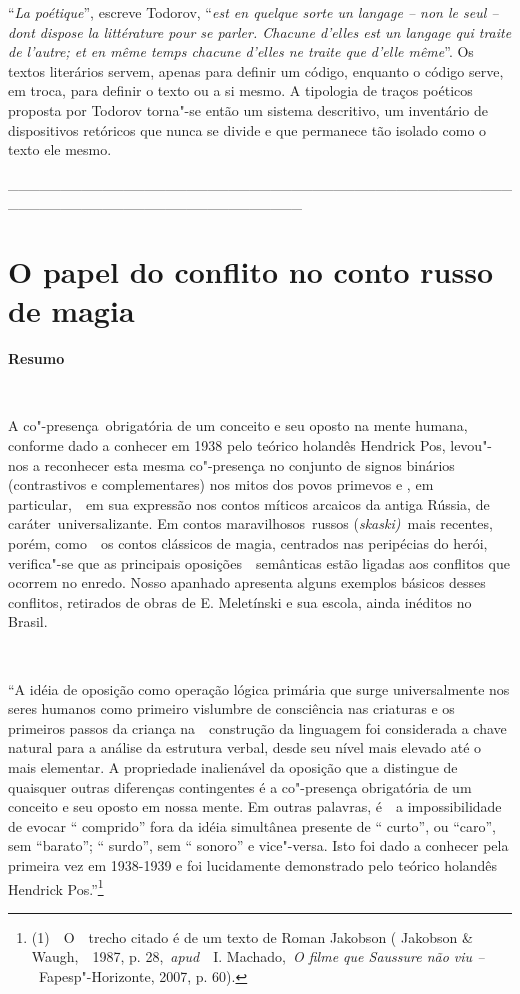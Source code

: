``\emph{La poétique}'', escreve Todorov, ``\emph{est en quelque sorte un
langage -- non le seul -- dont dispose la littérature pour se parler.
Chacune d'elles est un langage qui traite de l'autre; et en même temps
chacune d'elles ne traite que d'elle même}''. Os textos literários
servem, apenas para definir um código, enquanto o código serve, em
troca, para definir o texto ou a si mesmo. A tipologia de traços
poéticos proposta por Todorov torna"-se então um sistema descritivo, um
inventário de dispositivos retóricos que nunca se divide e que permanece
tão isolado como o texto ele mesmo.

\_\_\_\_\_\_\_\_\_\_\_\_\_\_\_\_\_\_\_\_\_\_\_\_\_\_\_\_\_\_\_\_\_\_\_\_\_\_\_\_\_\_\_\_\_\_\_\_\_\_\_\_\_\_\_\_\_\_\_\_\_\_\_\_\_\_\_\_\_\_\_\_\_\_\_\_

\chapter{O papel do conflito no conto russo de magia}

\textbf{Resumo}

\textbf{~}

A co"-presença~obrigatória de um conceito e seu oposto na mente humana,
conforme dado a conhecer em 1938 pelo teórico holandês Hendrick Pos,
levou"-nos a reconhecer esta mesma co"-presença no conjunto de signos
binários (contrastivos e complementares) nos mitos dos povos primevos e
, em particular,~~em sua expressão nos contos míticos arcaicos da antiga
Rússia, de caráter~universalizante. Em contos maravilhosos~russos
(\emph{skaski)~}mais recentes, porém, como~~os contos clássicos de
magia, centrados nas peripécias do herói, verifica"-se que as principais
oposições~~semânticas estão ligadas aos conflitos que ocorrem no enredo.
Nosso apanhado apresenta alguns exemplos básicos desses conflitos,
retirados de obras de E. Meletínski e sua escola, ainda inéditos no
Brasil.

\textbf{~}

``A idéia de oposição como operação lógica primária que surge
universalmente nos seres humanos como primeiro vislumbre de consciência
nas criaturas e os primeiros passos da criança na~~construção da
linguagem foi considerada a chave natural para a análise da estrutura
verbal, desde seu nível mais elevado até o mais elementar. A propriedade
inalienável da oposição que a distingue de quaisquer outras diferenças
contingentes é a co"-presença obrigatória de um conceito e seu oposto em
nossa mente. Em outras palavras, é~~a impossibilidade de evocar ``
comprido'' fora da idéia simultânea presente de `` curto'', ou ``caro'',
sem ``barato''; `` surdo'', sem `` sonoro'' e vice"-versa. Isto foi dado
a conhecer pela primeira vez em 1938-1939 e foi lucidamente demonstrado
pelo teórico holandês Hendrick Pos.''\footnote{(1)~~O~~trecho citado é
  de um texto de Roman Jakobson ( Jakobson \& Waugh,~~1987, p.
  28,~\emph{apud}~~I. Machado,~\emph{O filme que Saussure não viu
  --~}Fapesp"-Horizonte, 2007, p. 60).}

